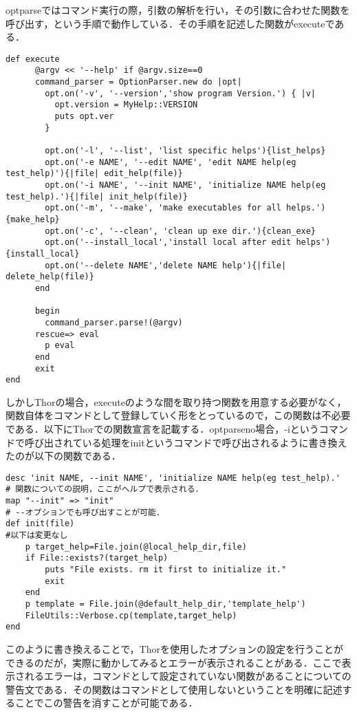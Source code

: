 optparseではコマンド実行の際，引数の解析を行い，その引数に合わせた関数を呼び出す，という手順で動作している．その手順を記述した関数がexecuteである．

\begin{verbatim}
def execute
      @argv << '--help' if @argv.size==0
      command_parser = OptionParser.new do |opt|
        opt.on('-v', '--version','show program Version.') { |v|
          opt.version = MyHelp::VERSION
          puts opt.ver
        }
        
        opt.on('-l', '--list', 'list specific helps'){list_helps}
        opt.on('-e NAME', '--edit NAME', 'edit NAME help(eg test_help)'){|file| edit_help(file)}
        opt.on('-i NAME', '--init NAME', 'initialize NAME help(eg test_help).'){|file| init_help(file)}
        opt.on('-m', '--make', 'make executables for all helps.'){make_help}
        opt.on('-c', '--clean', 'clean up exe dir.'){clean_exe}
        opt.on('--install_local','install local after edit helps'){install_local}
        opt.on('--delete NAME','delete NAME help'){|file| delete_help(file)}
      end
      
      begin
        command_parser.parse!(@argv)
      rescue=> eval
        p eval
      end
      exit
end
\end{verbatim}

しかしThorの場合，executeのような間を取り持つ関数を用意する必要がなく，関数自体をコマンドとして登録していく形をとっているので，この関数は不必要である．以下にThorでの関数宣言を記載する．optparseno場合，-iというコマンドで呼び出されている処理をinitというコマンドで呼び出されるように書き換えたのが以下の関数である．

\begin{verbatim}
desc 'init NAME, --init NAME', 'initialize NAME help(eg test_help).'
# 関数についての説明，ここがヘルプで表示される．
map "--init" => "init"
# --オプションでも呼び出すことが可能．
def init(file)
#以下は変更なし
    p target_help=File.join(@local_help_dir,file)
    if File::exists?(target_help)
        puts "File exists. rm it first to initialize it."
        exit
    end
    p template = File.join(@default_help_dir,'template_help')
    FileUtils::Verbose.cp(template,target_help)
end
\end{verbatim}

このように書き換えることで，Thorを使用したオプションの設定を行うことができるのだが，実際に動かしてみるとエラーが表示されることがある．ここで表示されるエラーは，コマンドとして設定されていない関数があることについての警告文である．その関数はコマンドとして使用しないということを明確に記述することでこの警告を消すことが可能である．


